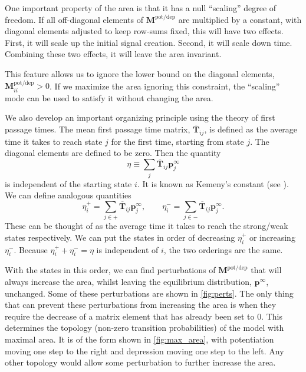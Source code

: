 \documentclass{article} %
\newcommand{\pr}{\mathbf{p}}
\newcommand{\eq}{\pr^\infty}
\newcommand{\fpt}{\mathbf{T}}
\newcommand{\fptb}{\overline{\fpt}}
\newcommand{\M}{\mathbf{M}}
\newcommand{\potdep}{^{\text{pot/dep}}}
\begin{document}
One important property of the area is that it has a null ``scaling'' degree of freedom.
If all off-diagonal elements of $\M\potdep$ are multiplied by a constant, with diagonal elements adjusted to keep row-sums fixed, this will have two effects.
First, it will scale up the initial signal creation.
Second, it will scale down time.
Combining these two effects, it will leave the area invariant.

This feature allows us to ignore the lower bound on the diagonal elements, $\M\potdep_{ii}>0$.
If we maximize the area ignoring this constraint, the ``scaling'' mode can be used to satisfy it without changing the area.

We also develop an important organizing principle using the theory of first passage times.
The mean first passage time matrix, $\fptb_{ij}$, is defined as the average time it takes to reach state $j$ for the first time, starting from state $j$.
The diagonal elements are defined to be zero.
Then the quantity
%
\begin{equation}\label{eq:kemenyconst}
  \eta \equiv \sum_j \fptb_{ij}\eq_j
\end{equation}
%
is independent of the starting state $i$.
It is known as Kemeny's constant (see \cite[\S4.4]{kemeny1960finite}).
We can define analogous quantities
%
\begin{equation}\label{eq:kemenypm}
   \eta^+_i = \sum_{j\in+} \fptb_{ij} \eq_j,
   \qquad
   \eta^-_i = \sum_{j\in-} \fptb_{ij} \eq_j.
\end{equation}
%
These can be thought of as the average time it takes to reach the strong/weak states respectively.
We can put the states in order of decreasing $\eta^+_i$ or increasing $\eta^-_i$.
Because $\eta^+_i+\eta^-_i=\eta$ is independent of $i$, the two orderings are the same.

With the states in this order, we can find perturbations of $\M\potdep$ that will always increase the area, whilst leaving the equilibrium distribution, $\eq$, unchanged.
Some of these perturbations are shown in \autoref{fig:perts}.
The only thing that can prevent these perturbations from increasing the area is when they require the decrease of a matrix element that has already been set to 0.
This determines the topology (non-zero transition probabilities) of the model with maximal area.
It is of the form shown in \autoref{fig:max_area}, with potentiation moving one step to the right and depression moving one step to the left.
Any other topology would allow some perturbation to further increase the area.
\end{document}
